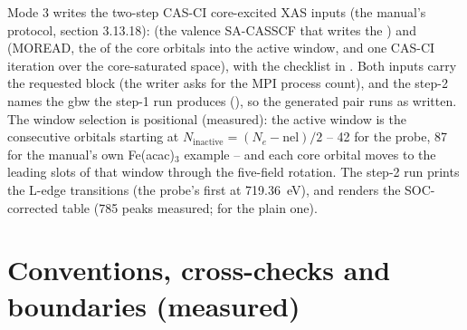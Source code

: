 Mode 3 writes the two-step CAS-CI core-excited XAS inputs (the manual's
protocol, section 3.13.18):  (the valence
SA-CASSCF that writes the ) and
 (MOREAD, the  of the
core orbitals into the active window,  and one
CAS-CI iteration over the core-saturated space), with the checklist in
.  Both inputs carry the requested
 block (the writer asks for the MPI process
count), and the step-2  names the gbw the step-1 run
produces (), so the generated pair
runs as written.  The window selection is positional
(measured): the active window is the  consecutive orbitals
starting at $N_{\text{inactive}} = (N_e - \mathrm{nel})/2$ -- 42 for the
 probe, 87 for the manual's own Fe(acac)$_3$ example -- and
each core orbital moves to the leading slots of that window through the
five-field  rotation.  The step-2 run prints the
L-edge transitions (the probe's first at 719.36~eV), and
 renders the SOC-corrected table (785
peaks measured;  for the plain one).

\section{Conventions, cross-checks and boundaries (measured)}

